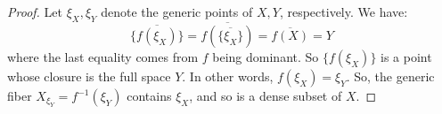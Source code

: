 \begin{proof}
	Let $\xi_X,\xi_Y$ denote the generic points of $X,Y$, respectively. We have:
	\[ \overline{\{f(\xi_X)\}} = \overline{f(\overline{\{\xi_X\}})} = \overline{f(X)} = Y \]
	where the last equality comes from $f$ being dominant. So $\{f(\xi_X)\}$ is a point whose closure is the full space $Y$. In other words, $f(\xi_X) = \xi_Y$. So, the generic fiber $X_{\xi_Y} = f^{-1}(\xi_Y)$ contains $\xi_X$, and so is a dense subset of $X$.
\end{proof}
